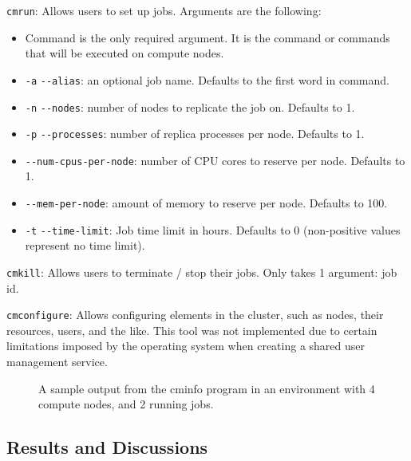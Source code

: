 \documentclass[sigconf]{acmart}
\begin{document}
\verb|cmrun|: Allows users to set up jobs. Arguments are the following:
\begin{itemize}
    \item Command is the only required argument. It is the command or commands that will be executed on compute nodes.
    \item \verb|-a| \verb|--alias|: an optional job name. Defaults to the first word in command.
    \item \verb|-n| \verb|--nodes|: number of nodes to replicate the job on. Defaults to 1.
    \item \verb|-p| \verb|--processes|: number of replica processes per node. Defaults to 1.
    \item \verb|--num-cpus-per-node|: number of CPU cores to reserve per node. Defaults to 1.
    \item \verb|--mem-per-node|: amount of memory to reserve per node. Defaults to 100.
    \item \verb|-t| \verb|--time-limit|: Job time limit in hours. Defaults to 0 (non-positive values represent no time limit).
\end{itemize}

\verb|cmkill|: Allows users to terminate / stop their jobs. Only takes 1 argument: job id.

\verb|cmconfigure|: Allows configuring elements in the cluster, such as nodes, their resources, users, and the
    like. This tool was not implemented due to certain limitations imposed by the operating system when creating a shared
    user management service.

\begin{figure}[ht]
    \centering
    
    \caption{A sample output from the cminfo program in an environment with 4 compute nodes, and 2 running jobs.}
    \label{fig:cminfo}
\end{figure}

\subsection{Results and Discussions}
\end{document}
